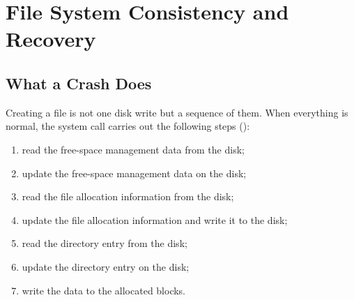 \section{File System Consistency and Recovery}
\label{sec:recovery}

\newcommand{\st}[1]{\sbox0{#1}\rlap{\hspace{-2pt}\color{sigc}\rule[0.6ex]{\dimexpr\wd0+4pt}{0.6pt}}\usebox0}

\subsection{What a Crash Does}

Creating a file is not one disk write but a sequence of them. When everything is normal, the system call carries out the following steps ():
\begin{enumerate}
  \item read the free-space management data from the disk;
  \item update the free-space management data on the disk;
  \item read the file allocation information from the disk;
  \item update the file allocation information and write it to the disk;
  \item read the directory entry from the disk;
  \item update the directory entry on the disk;
  \item write the data to the allocated blocks.
\end{enumerate}

